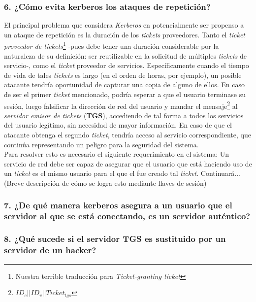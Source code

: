 \documentclass[12pt]{article}
\begin{document}
\subsubsection*{6. ¿Cómo evita kerberos los ataques de repetición?}
El principal problema que considera \textit{Kerberos} en potencialmente ser propenso a un ataque de repetición es la duración de los \textit{tickets} proveedores.
Tanto el \textit{ticket proveedor de tickets}\footnote{Nuestra terrible traducción para \textit{Ticket-granting ticket}} -pues debe tener una duración considerable por la naturaleza de su definición: ser reutilizable en la solicitud de múltiples \textit{tickets} de servicio-, como
el \textit{ticket} proveedor de servicios. Específicamente cuando el tiempo de vida de tales \textit{tickets} es largo (en el orden de horas, por ejemplo), un posible atacante tendría oportunidad de capturar una copia de alguno de ellos. En caso de ser el primer \textit{ticket} mencionado, podría esperar a que el usuario terminase su sesión, luego falsificar la dirección de red del usuario y mandar el mensaje\footnote{$ID_c||ID_v||Ticket_{tgs}$} al \textit{servidor emisor de tickets} (\textbf{TGS}), accediendo de tal forma a todos los servicios del usuario legítimo, sin necesidad de mayor información. En caso de que el atacante obtenga
el segundo \textit{ticket}, tendría acceso al servicio correspondiente, que continúa representando un peligro para la seguridad del sistema.\\

Para resolver esto es necesario el siguiente requerimiento en el sistema: Un servicio de red debe ser capaz de asegurar que el usuario que está haciendo uso de un \textit{ticket} es el mismo usuario para el que el fue creado tal \textit{ticket}.
Continuará... (Breve descripción de cómo se logra esto mediante llaves de sesión)




\subsubsection*{7. ¿De qué manera kerberos asegura a un usuario que el servidor al que se está conectando, es un 
servidor auténtico?}

\subsubsection*{8. ¿Qué sucede si el servidor TGS es sustituido por un servidor de un hacker? }
\end{document}
